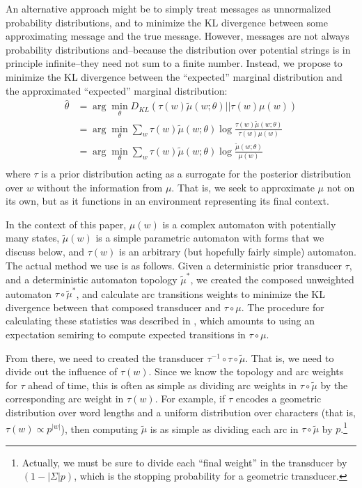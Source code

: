 \documentclass[11pt,a4paper]{article}
\begin{document}
An alternative approach might be to simply treat messages as
unnormalized probability distributions, and to minimize the KL
divergence between some approximating message and the true message.
However, messages are not always probability distributions and--because
the distribution over potential strings is in principle infinite--they
need not sum to a finite number. Instead, we propose to minimize
the KL divergence between the ``expected'' marginal distribution
and the approximated ``expected'' marginal distribution:
\begin{equation}
  \begin{split}
    \hat\theta &= \arg\!\min_{\theta} D_{KL}(\tau(w)\tilde\mu(w;\theta)||\tau(w)\mu(w) ) \\
    &= \arg\!\min_{\theta} \sum_w \tau(w) \tilde\mu(w;\theta) \log \frac{\tau(w)\tilde\mu(w;\theta)}{\tau(w)\mu(w)} \\
    &= \arg\!\min_{\theta} \sum_w \tau(w) \tilde\mu(w;\theta) \log \frac{\tilde\mu(w;\theta)}{\mu(w)} \\
   \end{split}
 \end{equation}
where $\tau$ is a prior distribution acting as a surrogate for the posterior
distribution over $w$ without the information from $\mu$. That is, we 
seek to approximate $\mu$ not on its own, but as it functions in
an environment representing its final context. 

In the context of this paper, $\mu(w)$ is a complex automaton with
potentially many states, $\tilde\mu(w)$ is a simple parametric automaton
with forms that we discuss below, and $\tau(w)$ is an arbitrary
(but hopefully fairly simple) automaton. The actual method we use
is as follows. Given a deterministic prior transducer $\tau$, and
a deterministic automaton topology $\tilde\mu^*$, we created the
composed unweighted automaton $\tau \circ \tilde\mu^*$, and calculate
arc transitions weights to minimize the KL divergence between that
composed transducer and $\tau\circ\mu$. The procedure for calculating
these statistics was described in , which
amounts to using an expectation semiring \cite{eisner2001expectation}
to compute expected transitions in $\tau\circ\mu$.

From there, we need to created the transducer
$\tau^{-1}\circ\tau\circ\tilde\mu$. That is, we need to divide out
the influence of $\tau(w)$. Since we know the topology and arc
weights for $\tau$ ahead of time, this is often as simple as dividing
arc weights in $\tau\circ\tilde\mu$ by the corresponding arc weight
in $\tau(w)$. For example, if $\tau$ encodes a geometric distribution
over word lengths and a uniform distribution over characters (that
is, $\tau(w) \propto {p^{|w|}}$), then computing $\tilde\mu$ is as
simple as dividing each arc in $\tau\circ\tilde\mu$ by
$p$.\footnote{Actually, we must be sure to divide each ``final
weight'' in the transducer by $(1-|\Sigma| p)$, which is the stopping
probability for a geometric transducer.}
\end{document}
